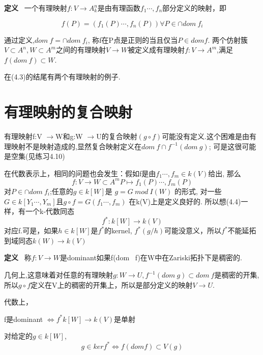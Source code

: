 \documentclass[UTF8]{book}
\begin{document}
\textbf{定义} \ 一个有理映射$f:V\rightarrow A^{n}_{k}$是由有理函数$f_{1}\cdots ,f_{n}$部分定义的映射，即

\begin{equation*}
f(P)=(f_{1}(P)\cdots, f_{n}(P)) \forall P\in \cap dom \ f_{i}
\end{equation*}

通过定义,$dom \ f=\cap dom \ f_{i}$, 称f在P点是正则的当且仅当$P\in dom f$. 两个仿射簇$V\subset A^{n},W\subset A^{m}$之间的有理映射$V\rightarrow W$被定义成有理映射$f:V\rightarrow A^{m}$,满足$f(dom \ f)\subset W.$

在(4.3)的结尾有两个有理映射的例子.

\section{有理映射的复合映射}
有理映射f:V $\rightarrow $W和g:W $\rightarrow $U的复合映射$(g\circ f)$可能没有定义.这个困难是由有理映射不是映射造成的,显然复合映射定义在$dom \ f\cap f^{-1}(dom \ g)$; 可是这很可能是空集(见练习4.10)

在代数表示上，相同的问题也会发生：假如f是由$f_{1}\cdots ,f_{m}\in k(V)$给出, 那么
\begin{equation*}
f:V \rightarrow W\subset A^{m}
P \mapsto f_{1}(P)\cdots, f_{m}(P)
\end{equation*}
对$P\in \cap dom \ f_{i}$;任意的$g\in k[W]$是 $g=G \ mod \ I(W)$ 的形式, 对一些$G\in k[Y_{1}\cdots,Y_{m}]$且$g\circ f=G(f_{1}\cdots ,f_{m})$ 在k(V)上是定义良好的. 所以想(4.4)一样，有一个k-代数同态
\begin{equation*}
f^{*}:k[W]\rightarrow k(V)
\end{equation*}
对应f.可是，如果$h\in k[W]$是$f^{*}$的kernel, $f^{*}(g/h)$可能没意义，所以$f^{*}$不能延拓到域同态$k(W)\rightarrow k(V)$

\textbf{定义} \ 称$f:V \rightarrow W$是dominant如果f(dom \ f)在W中在Zariski拓扑下是稠密的.

几何上,这意味着对任意的有理映射$g:W\rightarrow U,  f^{-1}(dom \ g)\subset dom \ f$是稠密的开集,所以$g\circ f$定义在V上的稠密的开集上，所以是部分定义的映射$V\rightarrow U$.

代数上，

\center  f是dominant $\iff f^{*}k[W]\rightarrow k(V)$是单射

\justifying
对给定的$g\in k[W]$,
\begin{equation*}
g\in ker f^{*} \iff f(dom f)\subset V(g)
\end{equation*}
\end{document}
